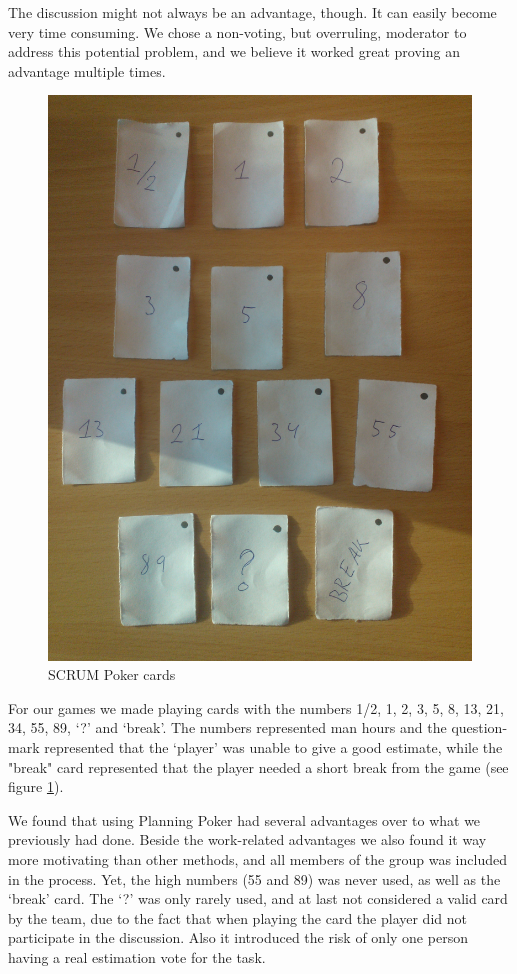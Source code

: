 The discussion might not always be an advantage, though. It can easily become very time consuming. We chose a non-voting, but overruling, moderator to address this potential problem, and we believe it worked great proving an advantage multiple times.

\begin{figure}[H]
  \centering
  \includegraphics[width=\textwidth, angle=270]{illustrations/scrumPokerCards.jpg}
  \caption{SCRUM Poker cards}
  \label{fig:scrumPokerCards}
\end{figure}

For our games we made playing cards with the numbers 1/2, 1, 2, 3, 5, 8, 13, 21, 34, 55, 89, `?' and `break'. The numbers represented man hours and the question-mark represented that the `player' was unable to give a good estimate, while the "break" card represented that the player needed a short break from the game (see figure \ref{fig:scrumPokerCards}).

We found that using Planning Poker had several advantages over to what we previously had done. Beside the work-related advantages we also found it way more motivating than other methods, and all members of the group was included in the process. Yet, the high numbers (55 and 89) was never used, as well as the `break' card. The `?' was only rarely used, and at last not considered a valid card by the team, due to the fact that when playing the card the player did not participate in the discussion. Also it introduced the risk of only one person having a real estimation vote for the task.


